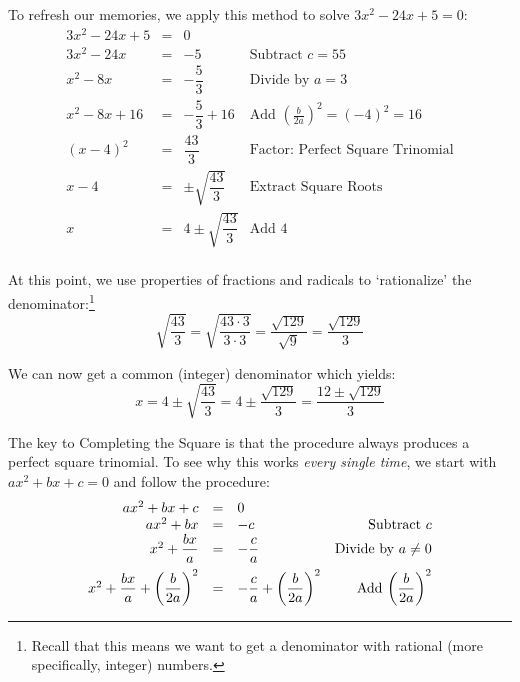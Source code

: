 \documentclass{ximera}
\begin{document}

\medskip

To refresh our memories, we apply this method to solve $3x^2 - 24x + 5 = 0$: \[ \begin{array}{rclr}

3x^2 - 24x + 5 & = & 0 & \\

3x^2 - 24x  & = & -5 & \text{Subtract  $c = 55$} \\

x^2 - 8x & = & -\dfrac{5}{3} & \text{Divide by $a = 3$} \\ [8pt]

x^2 - 8x + 16 & = & -\dfrac{5}{3} + 16 & \text{Add $\left(\frac{b}{2a}\right)^2 = (-4)^2 = 16$} \\ [8pt]

(x - 4)^2 & = & \dfrac{43}{3} & \text{Factor: Perfect Square Trinomial} \\

x - 4 & = & \pm \sqrt{\dfrac{43}{3}} & \text{Extract Square Roots} \\ [5pt]

x & = & 4 \pm \sqrt{\dfrac{43}{3}} & \text{Add $4$} \\

\end{array}\]

At this point, we use properties of fractions and radicals to `rationalize' the denominator:\footnote{Recall that this means we want to get a denominator with rational (more specifically, integer) numbers.}  \[ \sqrt{\dfrac{43}{3}} = \sqrt{\dfrac{43 \cdot 3}{3 \cdot 3}} = \dfrac{\sqrt{129}}{\sqrt{9}} = \dfrac{\sqrt{129}}{3} \]

We can now get a common (integer) denominator which yields: \[x=  4 \pm \sqrt{\dfrac{43}{3}} = 4 \pm \dfrac{\sqrt{129}}{3} = \dfrac{12 \pm \sqrt{129}}{3} \]

The key to Completing the Square is that the procedure always produces a perfect square trinomial. To see why this works \textit{every single time}, we start with $ax^2 + bx + c = 0$ and follow the procedure:\[ \begin{array}{rclr}

ax^2 + bx + c & = & 0 & \\

ax^2 + bx & = & -c & \text{Subtract $c$} \\

x^2 + \dfrac{bx}{a} & = & -\dfrac{c}{a} & \text{Divide by $a \neq 0$} \\ [8pt]

x^2 + \dfrac{bx}{a} + \left(\dfrac{b}{2a}\right)^2 & = & -\dfrac{c}{a} + \left(\dfrac{b}{2a}\right)^2 & \text{Add $ \left(\dfrac{b}{2a}\right)^2$} \\

\end{array} \]
\end{document}
